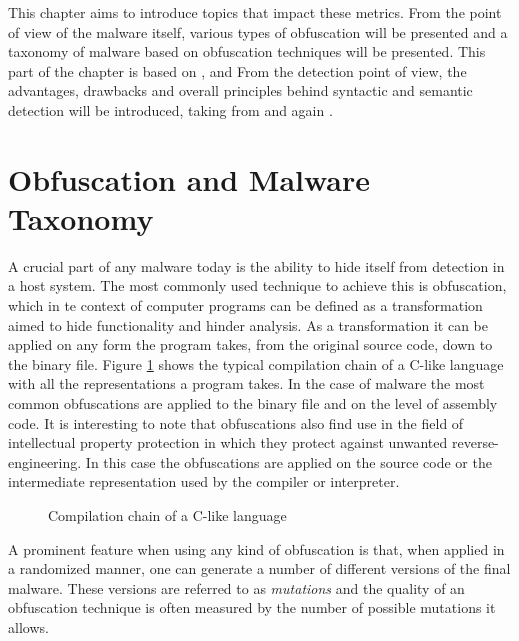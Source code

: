This chapter aims to introduce topics that impact these metrics. From the point of view of the malware itself, various types of obfuscation will be presented and a taxonomy of malware based on obfuscation techniques will be presented. This part of the chapter is based on \cite{You10}, \cite{Shiffman10} and \cite{Szor05} From the detection point of view, the advantages, drawbacks and overall principles behind syntactic and semantic detection will be introduced, taking from \cite{Jacob08} and again \cite{Szor05}.

\section{Obfuscation and Malware Taxonomy}
A crucial part of any malware today is the ability to hide itself from detection in a host system. The most commonly used technique to achieve this is obfuscation, which in te context of computer programs can be defined as a transformation aimed to hide functionality and hinder analysis. As a transformation it can be applied on any form the program takes, from the original source code, down to the binary file. Figure \ref{fig_comp} shows the typical compilation chain of a C-like language with all the representations a program takes. In the case of malware the most common obfuscations are applied to the binary file and on the level of assembly code. It is interesting to note that obfuscations also find use in the field of intellectual property protection in which they protect against unwanted reverse-engineering. In this case the obfuscations are applied on the source code or the intermediate representation used by the compiler or interpreter.

\begin{figure}[H]
    \centering
    \caption{Compilation chain of a C-like language}
    \label{fig_comp}
\end{figure}

A prominent feature when using any kind of obfuscation is that, when applied in a randomized manner, one can generate a number of different versions of the final malware. These versions are referred to as \emph{mutations} and the quality of an obfuscation technique is often measured by the number of possible mutations it allows.

